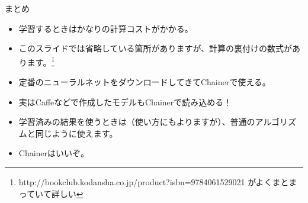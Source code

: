 \documentclass[12pt, unicode]{beamer}
\begin{document}
\begin{frame}{まとめ}
\begin{block}{}
\begin{itemize}
\item 学習するときはかなりの計算コストがかかる。
\item このスライドでは省略している箇所がありますが、計算の裏付けの数式があります。\footnote[frame]{http://bookclub.kodansha.co.jp/product?isbn=9784061529021 がよくまとまっていて詳しい}
\item 定番のニューラルネットをダウンロードしてきてChainerで使える。
\item 実はCaffeなどで作成したモデルもChainerで読み込める！
\item 学習済みの結果を使うときは（使い方にもよりますが）、普通のアルゴリズムと同じように使えます。
\item Chainerはいいぞ。
\end{itemize}
\end{block}
\end{frame}
\end{document}
